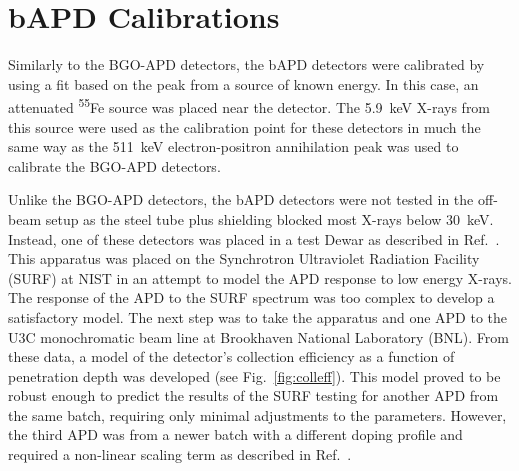 \documentclass[oneside,12pt]{memoir}
\begin{document}
\section{bAPD Calibrations}
Similarly to the BGO-APD detectors, the bAPD detectors were calibrated by using a fit based on the peak from a source of known energy. In this case, an attenuated \textsuperscript{55}Fe source was placed near the detector. The 5.9~keV X-rays from this source were used as the calibration point for these detectors in much the same way as the 511~keV electron-positron annihilation peak was used to calibrate the BGO-APD detectors.\par
Unlike the BGO-APD detectors, the bAPD detectors were not tested in the off-beam setup as the steel tube plus shielding blocked most X-rays below 30~keV. Instead, one of these detectors was placed in a test Dewar as described in Ref.~\cite{gentile12a}. This apparatus was placed on the Synchrotron Ultraviolet Radiation Facility (SURF) at NIST in an attempt to model the APD response to low energy X-rays. The response of the APD to the SURF spectrum was too complex to develop a satisfactory model. The next step was to take the apparatus and one APD to the U3C monochromatic beam line at Brookhaven National Laboratory (BNL). From these data, a model of the detector's collection efficiency as a function of penetration depth was developed (see Fig.~\ref{fig:colleff}). This model proved to be robust enough to predict the results of the SURF testing for another APD from the same batch, requiring only minimal adjustments to the parameters. However, the third APD was from a newer batch with a different doping profile and required a non-linear scaling term as described in Ref.~\cite{gentile12a}.\par
\label{sec:bapd_cal}
\end{document}

